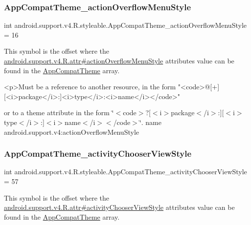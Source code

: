 \subsubsection{\texorpdfstring{App\+Compat\+Theme\+\_\+action\+Overflow\+Menu\+Style}{AppCompatTheme\_actionOverflowMenuStyle}}
{\footnotesize\ttfamily int android.\+support.\+v4.\+R.\+styleable.\+App\+Compat\+Theme\+\_\+action\+Overflow\+Menu\+Style = 16\hspace{0.3cm}{\ttfamily [static]}}

This symbol is the offset where the \hyperlink{classandroid_1_1support_1_1v4_1_1R_1_1attr_adc55e21231727981af7f193f97233f39}{android.\+support.\+v4.\+R.\+attr\#action\+Overflow\+Menu\+Style} attribute\textquotesingle{}s value can be found in the \hyperlink{classandroid_1_1support_1_1v4_1_1R_1_1styleable_ac07ebbe62ed977f6dcaadc6397840ace}{App\+Compat\+Theme} array.

\begin{DoxyVerb}      <p>Must be a reference to another resource, in the form "<code>@[+][<i>package</i>:]<i>type</i>:<i>name</i></code>"
\end{DoxyVerb}
 or to a theme attribute in the form \char`\"{}$<$code$>$?\mbox{[}$<$i$>$package$<$/i$>$\+:\mbox{]}\mbox{[}$<$i$>$type$<$/i$>$\+:\mbox{]}$<$i$>$name$<$/i$>$$<$/code$>$\char`\"{}.  name android.\+support.\+v4\+:action\+Overflow\+Menu\+Style \mbox{\label{classandroid_1_1support_1_1v4_1_1R_1_1styleable_a52ee8fc4fb3df2bd060e60002e7c3fd2}} 
\subsubsection{\texorpdfstring{App\+Compat\+Theme\+\_\+activity\+Chooser\+View\+Style}{AppCompatTheme\_activityChooserViewStyle}}
{\footnotesize\ttfamily int android.\+support.\+v4.\+R.\+styleable.\+App\+Compat\+Theme\+\_\+activity\+Chooser\+View\+Style = 57\hspace{0.3cm}{\ttfamily [static]}}

This symbol is the offset where the \hyperlink{classandroid_1_1support_1_1v4_1_1R_1_1attr_a7b486bbf67b2e1692b9e51eafcbe82d1}{android.\+support.\+v4.\+R.\+attr\#activity\+Chooser\+View\+Style} attribute\textquotesingle{}s value can be found in the \hyperlink{classandroid_1_1support_1_1v4_1_1R_1_1styleable_ac07ebbe62ed977f6dcaadc6397840ace}{App\+Compat\+Theme} array.

